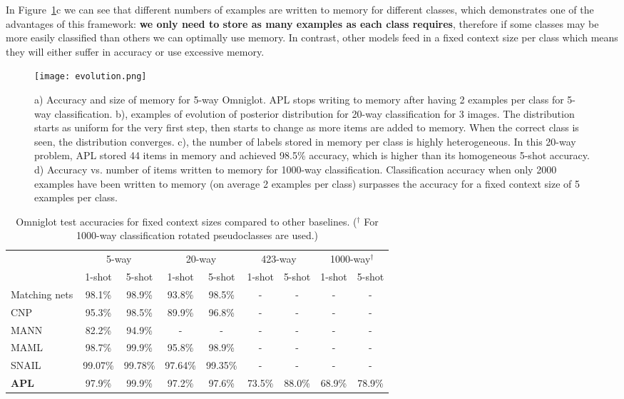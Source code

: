 \documentclass{article} \usepackage{iclr2019_conference,times}
\begin{document}
In Figure~\ref{fig:evolution}c we can see that different numbers of examples are written to memory for different classes, which demonstrates one of the advantages of this framework: \textbf{we only need to store as many examples as each class requires}, therefore if some classes may be more easily classified than others we can optimally use memory. In contrast, other models feed in a fixed context size per class which means they will either suffer in accuracy or use excessive memory.

\begin{figure}[ht]
\begin{center}
\texttt{[image: evolution.png]}
\end{center}
\caption{a) Accuracy and size of memory for 5-way Omniglot. APL stops writing to memory after having 2 examples per class for 5-way classification. b), examples of evolution of posterior distribution for 20-way classification for 3 images. The distribution starts as uniform for the very first step, then starts to change as more items are added to memory. When the correct class is seen, the distribution converges. c), the number of labels stored in memory per class is highly heterogeneous. In this 20-way problem, APL stored 44 items in memory and achieved 98.5\% accuracy, which is higher than its homogeneous 5-shot accuracy. d) Accuracy vs. number of items written to memory for 1000-way classification. Classification accuracy when only 2000 examples have been written to memory (on average 2 examples per class) surpasses the accuracy for a fixed context size of 5 examples per class.}
\label{fig:evolution}
\end{figure}

\begin{table}[ht]
\centering
\begin{tabularx}{\textwidth}{lcccccccc}
& \multicolumn{2}{c}{5-way} & \multicolumn{2}{c}{20-way} & \multicolumn{2}{c}{423-way} & \multicolumn{2}{c}{1000-way$^\dagger$} \\
\cline{2-9}
& 1-shot & 5-shot & 1-shot & 5-shot & 1-shot & 5-shot & 1-shot & 5-shot \\
\hline
Matching nets & 98.1\% & 98.9\% & 93.8\% & 98.5\% & - & - & - & - \\
CNP & 95.3\% & 98.5\% & 89.9\% & 96.8\% & - & - & - & -\\
MANN & 82.2\% & 94.9\% & - & - & - & -  & - & -\\
MAML & 98.7\% & 99.9\% & 95.8\% & 98.9\% & - & - & - & -\\
SNAIL & 99.07\% & 99.78\% & 97.64\% & 99.35\% & - & - & - & - \\
\hline
\textbf{APL} & 97.9\% & 99.9\% & 97.2\% & 97.6\% & 73.5\% & 88.0\%  & 68.9\% & 78.9\% \\
\hline
\end{tabularx}
\caption{Omniglot test accuracies for fixed context sizes compared to other baselines. ($^\dagger$ For 1000-way classification rotated pseudoclasses are used.)}
\label{table:onniglot}
\end{table}
\end{document}
